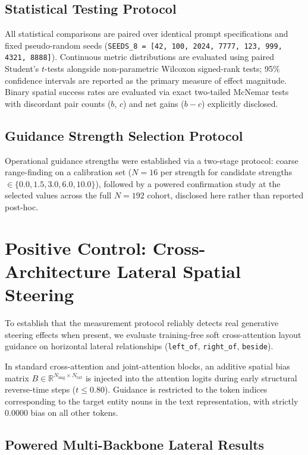\documentclass[10pt,twocolumn,letterpaper]{article}
\begin{document}
\subsection{Statistical Testing Protocol}
All statistical comparisons are paired over identical prompt specifications and fixed pseudo-random seeds (\texttt{SEEDS\_8 = [42, 100, 2024, 7777, 123, 999, 4321, 8888]}). Continuous metric distributions are evaluated using paired Student's $t$-tests alongside non-parametric Wilcoxon signed-rank tests; 95\% confidence intervals are reported as the primary measure of effect magnitude. Binary spatial success rates are evaluated via exact two-tailed McNemar tests with discordant pair counts ($b$, $c$) and net gains ($b - c$) explicitly disclosed.

\subsection{Guidance Strength Selection Protocol}
Operational guidance strengths were established via a two-stage protocol: coarse range-finding on a calibration set ($N = 16$ per strength for candidate strengths $\in \{0.0, 1.5, 3.0, 6.0, 10.0\}$), followed by a powered confirmation study at the selected values across the full $N = 192$ cohort, disclosed here rather than reported post-hoc.

\section{Positive Control: Cross-Architecture Lateral Spatial Steering}

To establish that the measurement protocol reliably detects real generative steering effects when present, we evaluate training-free soft cross-attention layout guidance on horizontal lateral relationships (\texttt{left\_of}, \texttt{right\_of}, \texttt{beside}).

In standard cross-attention and joint-attention blocks, an additive spatial bias matrix $B \in \mathbb{R}^{N_{\text{img}} \times N_{\text{txt}}}$ is injected into the attention logits during early structural reverse-time steps ($t \le 0.80$). Guidance is restricted to the token indices corresponding to the target entity nouns in the text representation, with strictly $0.0000$ bias on all other tokens.

\subsection{Powered Multi-Backbone Lateral Results}
\end{document}
